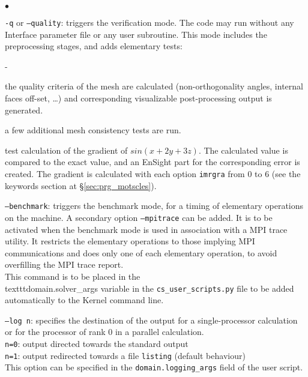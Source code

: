 {{{\begin{list}{$\bullet$}{}
\item \texttt{-q} or \texttt{--quality}: triggers the verification mode.
The code may run without any Interface parameter file or any user subroutine.
This mode includes the preprocessing stages, and adds elementary tests:\\
\begin{list}{-}{}
\item the quality criteria of the mesh are calculated (non-orthogonality angles,
internal faces off-set, \ldots) and corresponding
visualizable post-processing output is generated.\\
\item a few additional mesh consistency tests are run.\\
\item test calculation of the gradient of $sin(x+2y+3z)$. The calculated
value is compared to the exact value, and an EnSight part for the
corresponding error is created. The gradient is calculated with each
option \texttt{imrgra} from $0$ to $6$ (see the keywords section at \S\ref{sec:prg_motscles}).\\
\end{list}

\item \texttt{--benchmark}: triggers the benchmark mode, for a timing
of elementary operations on the machine. A secondary option
\texttt{--mpitrace} can be added. It is to be activated when the benchmark mode
is used in association with a MPI trace utility. It restricts the elementary
operations to those implying MPI communications and does only one of each
elementary operation, to avoid overfilling the MPI trace report.\\
This command is to be placed in the \\texttt{domain.solver\_args} variable
in the \texttt{cs\_user\_scripts.py} file to be added automatically to the
Kernel command line.

\item \texttt{--log n}: specifies the destination of the output for a
single-processor calculation or for the processor of rank 0 in a parallel
calculation.\\
\hspace*{0.5cm}\texttt{n=0}: output directed towards the standard output\\
\hspace*{0.5cm}\texttt{n=1}: output redirected towards a file \texttt{listing}
(default behaviour)\\
This option can be specified in the \texttt{domain.logging\_args} field
of the user script.


\end{list}}}}
